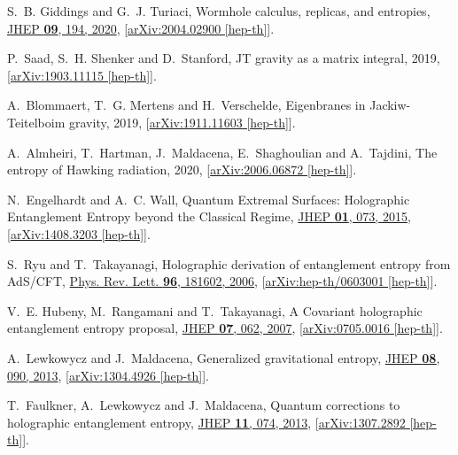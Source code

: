 \documentclass[11pt]{article}
\numberwithin{equation}{section}
\begin{document}
\begin{thebibliography}{10}
S.~B. Giddings and G.~J. Turiaci, {{Wormhole calculus, replicas, and
  entropies}}, \href{http://dx.doi.org/10.1007/JHEP09(2020)194}{JHEP {\bf 09},
  194, 2020}, [\href{http://arxiv.org/abs/arXiv:2004.02900}{{arXiv:2004.02900
  [hep-th]}}].

P.~Saad, S.~H. Shenker and D.~Stanford, {{JT gravity as a matrix integral}},
  2019, [\href{http://arxiv.org/abs/arXiv:1903.11115}{{arXiv:1903.11115
  [hep-th]}}].

A.~Blommaert, T.~G. Mertens and H.~Verschelde, {{Eigenbranes in
  Jackiw-Teitelboim gravity}},  2019,
  [\href{http://arxiv.org/abs/arXiv:1911.11603}{{arXiv:1911.11603 [hep-th]}}].

A.~Almheiri, T.~Hartman, J.~Maldacena, E.~Shaghoulian and A.~Tajdini, {{The
  entropy of Hawking radiation}},  2020,
  [\href{http://arxiv.org/abs/arXiv:2006.06872}{{arXiv:2006.06872 [hep-th]}}].

N.~Engelhardt and A.~C. Wall, {{Quantum Extremal Surfaces: Holographic
  Entanglement Entropy beyond the Classical Regime}},
  \href{http://dx.doi.org/10.1007/JHEP01(2015)073}{JHEP {\bf 01}, 073, 2015},
  [\href{http://arxiv.org/abs/arXiv:1408.3203}{{arXiv:1408.3203 [hep-th]}}].

S.~Ryu and T.~Takayanagi, {{Holographic derivation of entanglement entropy from
  AdS/CFT}}, \href{http://dx.doi.org/10.1103/PhysRevLett.96.181602}{Phys. Rev.
  Lett. {\bf 96}, 181602, 2006},
  [\href{http://arxiv.org/abs/arXiv:hep-th/0603001}{{arXiv:hep-th/0603001
  [hep-th]}}].

V.~E. Hubeny, M.~Rangamani and T.~Takayanagi, {{A Covariant holographic
  entanglement entropy proposal}},
  \href{http://dx.doi.org/10.1088/1126-6708/2007/07/062}{JHEP {\bf 07}, 062,
  2007}, [\href{http://arxiv.org/abs/arXiv:0705.0016}{{arXiv:0705.0016
  [hep-th]}}].

A.~Lewkowycz and J.~Maldacena, {{Generalized gravitational entropy}},
  \href{http://dx.doi.org/10.1007/JHEP08(2013)090}{JHEP {\bf 08}, 090, 2013},
  [\href{http://arxiv.org/abs/arXiv:1304.4926}{{arXiv:1304.4926 [hep-th]}}].

T.~Faulkner, A.~Lewkowycz and J.~Maldacena, {{Quantum corrections to
  holographic entanglement entropy}},
  \href{http://dx.doi.org/10.1007/JHEP11(2013)074}{JHEP {\bf 11}, 074, 2013},
  [\href{http://arxiv.org/abs/arXiv:1307.2892}{{arXiv:1307.2892 [hep-th]}}].


\end{thebibliography}
\end{document}
